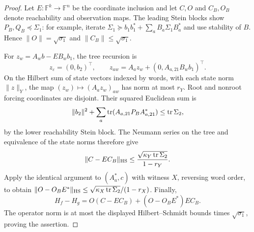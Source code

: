 \begin{proof}
Let $E:\mathbb F^k\to\mathbb F^n$ be the coordinate inclusion and
let $C,O$ and $C_B,O_B$ denote reachability and observation maps.
The leading Stein blocks show $P_B,Q_B\preceq\Sigma_1$: for example,
iterate $\Sigma_1\succeq b_1b_1^*+\sum_aB_a\Sigma_1B_a^*$ and
use stability of $B$. Hence $\|O\|=\sqrt{\sigma_1}$ and
$\|C_B\|\le\sqrt{\sigma_1}$.

For $z_w=A_wb-EB_wb_1$, the tree recursion is
\[
 z_\varepsilon=(0,b_2)^\top,\qquad
 z_{aw}=A_az_w+(0,A_{a,21}B_wb_1)^\top.
\]
On the Hilbert sum of state vectors indexed by words, with each state
norm $\|z\|_Y$, the map $(z_w)\mapsto(A_az_w)_{aw}$ has norm at
most $r_Y$. Root and nonroot forcing coordinates are disjoint. Their
squared Euclidean sum is
\[
 \|b_2\|^2+\sum_a\operatorname{tr}(A_{a,21}P_BA_{a,21}^*)
 \le\operatorname{tr}\Sigma_2,
\]
by the lower reachability Stein block. The Neumann series on the tree
and equivalence of the state norms therefore give
\[
 \|C-EC_B\|_{\rm HS}
 \le\frac{\sqrt{\kappa_Y\operatorname{tr}\Sigma_2}}{1-r_Y}.
\]
Apply the identical argument to $(A_a^*,c)$ with witness $X$, reversing
word order, to obtain
$\|O-O_BE^*\|_{\rm HS}\le
\sqrt{\kappa_X\operatorname{tr}\Sigma_2}/(1-r_X)$. Finally,
\[
 H_f-H_g=O(C-EC_B)+(O-O_BE^*)EC_B.
\]
The operator norm is at most the displayed Hilbert--Schmidt bounds
times $\sqrt{\sigma_1}$, proving the assertion.
\end{proof}
